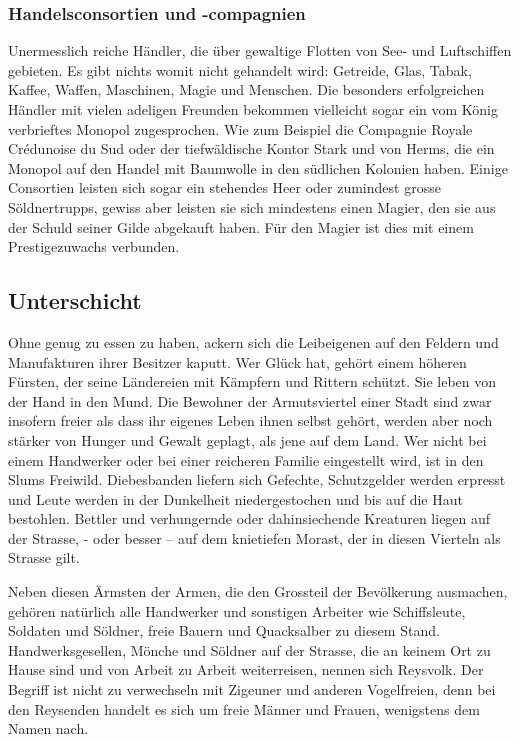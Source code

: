 \documentclass[10pt,twoside,twocolumn,openany]{book}
\begin{document}
\subsubsection{Handelsconsortien und -compagnien}
Unermesslich reiche Händler, die über gewaltige Flotten von See- und Luftschiffen gebieten. Es gibt nichts womit nicht gehandelt wird: Getreide, Glas, Tabak, Kaffee, Waffen, Maschinen, Magie und Menschen.
Die besonders erfolgreichen Händler mit vielen adeligen Freunden bekommen vielleicht sogar ein vom König verbrieftes Monopol zugesprochen. Wie zum Beispiel die Compagnie Royale Crédunoise du Sud oder der tiefwäldische Kontor Stark und von Herms, die ein  Monopol auf den Handel mit Baumwolle in den südlichen Kolonien haben.
Einige Consortien leisten sich sogar ein stehendes Heer oder zumindest grosse Söldnertrupps, gewiss aber leisten sie sich mindestens einen Magier, den sie aus der Schuld seiner Gilde abgekauft haben. Für den Magier ist dies mit einem Prestigezuwachs verbunden.


\subsection{Unterschicht}
Ohne genug zu essen zu haben, ackern sich die Leibeigenen auf den Feldern und Manufakturen ihrer Besitzer kaputt. Wer Glück hat, gehört einem höheren Fürsten, der seine Ländereien mit Kämpfern und Rittern schützt. Sie leben von der Hand in den Mund.
Die Bewohner der Armutsviertel einer Stadt sind zwar insofern freier als dass ihr eigenes Leben ihnen selbst gehört, werden aber noch stärker von Hunger und Gewalt geplagt, als jene auf dem Land. Wer nicht bei einem Handwerker oder bei einer reicheren Familie eingestellt wird, ist in den Slums Freiwild. Diebesbanden liefern sich Gefechte, Schutzgelder werden erpresst und Leute werden in der Dunkelheit niedergestochen und bis auf die Haut bestohlen. Bettler und verhungernde oder dahinsiechende Kreaturen liegen auf der Strasse, - oder besser – auf dem knietiefen Morast, der in diesen Vierteln als Strasse gilt.

Neben diesen Ärmsten der Armen, die den Grossteil der Bevölkerung ausmachen, gehören natürlich alle Handwerker und sonstigen Arbeiter wie Schiffsleute, Soldaten und Söldner, freie Bauern und Quacksalber zu diesem Stand. Handwerksgesellen, Mönche und Söldner auf der Strasse, die an keinem Ort zu Hause sind und von Arbeit zu Arbeit weiterreisen, nennen sich Reysvolk. Der Begriff ist nicht zu verwechseln mit Zigeuner und anderen Vogelfreien, denn bei den Reysenden handelt es sich um freie Männer und Frauen, wenigstens dem Namen nach.
\end{document}
